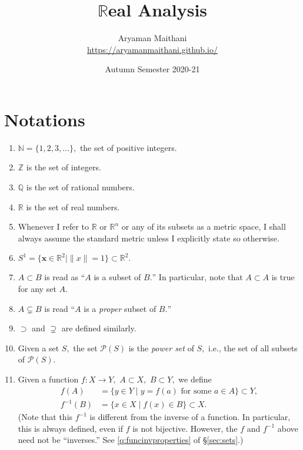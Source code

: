\documentclass[12pt]{article}
\title{$\mathbb{R}$eal Analysis}
\author{Aryaman Maithani\\\url{https://aryamanmaithani.github.io/}}
\date{Autumn Semester 2020-21}
\theoremstyle{definition}
\numberwithin{thm}{section}
\begin{document}
\maketitle
\setcounter{section}{-1}
\tableofcontents
\newpage\section{Notations} \label{sec:notations}
\begin{enumerate}
	\item $\mathbb{N} = \{1, 2, 3, \ldots\},$ the set of positive integers.
	\item $\mathbb{Z}$ is the set of integers.
	\item $\mathbb{Q}$ is the set of rational numbers.
	\item $\mathbb{R}$ is the set of real numbers.
	\item Whenever I refer to $\mathbb{R}$ or $\mathbb{R}^n$ or any of its subsets as a metric space, I shall always assume the standard metric unless I explicitly state so otherwise.
	\item $S^1 = \{\mathbf{x} \in \mathbb{R}^2 \mid \|x\| = 1\} \subset \mathbb{R}^2.$ 
	\item $A \subset B$ is read as ``$A$ is a subset of $B.$'' In particular, note that $A \subset A$ is true for any set $A.$
	\item $A \subsetneq B$ is read ``$A$ is a \emph{proper} subset of $B.$''
	\item $\supset$ and $\supsetneq$ are defined similarly.
	\item Given a set $S,$ the set $\mathcal{P}(S)$ is the \emph{power set} of $S,$ i.e., the set of all subsets of $\mathcal{P}(S).$
	\item Given a function $f:X \to Y,$ $A \subset X,$ $B \subset Y,$ we define
	\begin{align*} 
		f(A) &= \{y \in Y \mid y = f(a) \text{ for some } a \in A\} \subset Y,\\
		f^{-1}(B) &= \{x \in X \mid f(x) \in B\} \subset X.
	\end{align*}
	(Note that this $f^{-1}$ is different from the inverse of a function. In particular, this is always defined, even if $f$ is not bijective. However, the $f$ and $f^{-1}$ above need not be ``inverses.'' See \ref{q:funcinvproperties} of \S\ref{sec:sets}.)\\

\end{enumerate}
\end{document}
